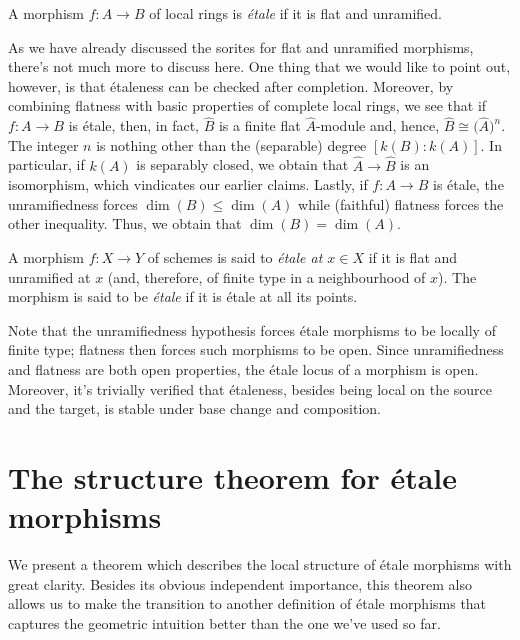 \begin{definition}
\label{definition-etale-ring}
A morphism $f:A \to B$ of local rings is
{\it \'etale} if it is flat and unramified.
\end{definition}

\noindent
As we have already discussed the sorites for flat and unramified morphisms,
there's not much more to discuss here. One thing that we would like to point
out, however, is that \'etaleness can be checked after completion. Moreover,
by combining flatness with basic properties of complete local rings, we see
that if $f:A \to B$ is \'etale, then, in fact, $\widehat{B}$ is a finite flat
$\widehat{A}$-module and, hence, $\widehat{B} \cong \big(\widehat{A}\big)^n$.
The integer $n$ is nothing other than the (separable) degree $[k(B):k(A)]$.
In particular, if $k(A)$ is separably closed, we obtain that
$\widehat{A} \to \widehat{B}$ is an isomorphism, which vindicates our earlier
claims. Lastly, if $f:A \to B$ is \'etale, the unramifiedness forces
$\dim(B) \leq  \dim(A)$ while (faithful) flatness forces the other
inequality. Thus, we obtain that $\dim(B) = \dim(A)$.

\begin{definition}
\label{definition-etale-schemes-1}
A morphism $f:X \to Y$ of schemes is said to
{\it \'etale at $x \in X$} if it is
flat and unramified at $x$ (and, therefore, of finite type in a neighbourhood
of $x$). The morphism is said to be
{\it \'etale} if it is \'etale at all its points.
\end{definition}

\noindent
Note that the unramifiedness hypothesis forces \'etale morphisms to be
locally of finite type; flatness then forces such morphisms to be open.
Since unramifiedness and flatness are both open properties, the \'etale
locus of a morphism is open. Moreover, it's trivially verified that
\'etaleness, besides being local on the source and the target, is stable
under base change and composition. 

\section{The structure theorem for \'etale morphisms}
\label{section-structure-etale-map}

\noindent
We present a theorem which describes the local structure of \'etale morphisms
with great clarity. Besides its obvious independent importance, this theorem
also allows us to make the transition to another definition of \'etale
morphisms that captures the geometric intuition better than the one we've
used so far. 


